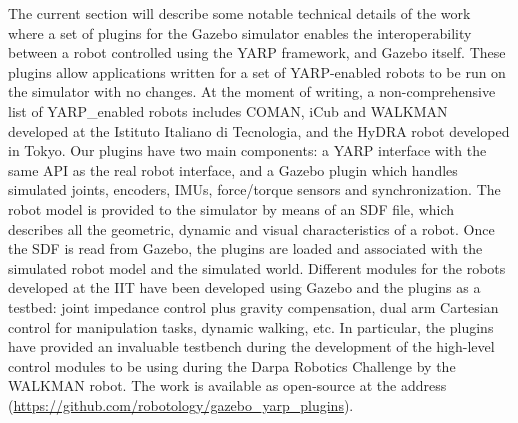 The current section will describe some notable technical details of the work~\cite{hoffman2014yarp} where a set of plugins for the Gazebo simulator  enables the interoperability between a robot controlled using the YARP framework, and Gazebo itself. These plugins allow applications written for a set of YARP-enabled robots to be run on the simulator with no changes. At the moment of writing, a non-comprehensive list of YARP_enabled robots includes COMAN, iCub and WALKMAN developed at the Istituto Italiano di Tecnologia, and the HyDRA robot developed in Tokyo. Our plugins have two main components: a YARP interface with the same API as the real robot interface, and a Gazebo plugin which handles simulated joints, encoders, IMUs, force/torque sensors and synchronization. The robot model is provided to the simulator by means of an SDF file, which describes all the geometric, dynamic and visual characteristics of a robot.
Once the SDF is read from Gazebo, the plugins are loaded and associated with the simulated robot model and the simulated world. Different modules for the robots developed at the IIT have been developed using Gazebo and the plugins as a testbed: joint impedance control plus gravity compensation, dual arm Cartesian control for manipulation tasks, dynamic walking, etc. In particular, the plugins have provided an invaluable testbench during the development of the high-level control modules to be using during the Darpa Robotics Challenge by the WALKMAN robot.
The work is available as open-source at the address (\url{https://github.com/robotology/gazebo_yarp_plugins}). 

